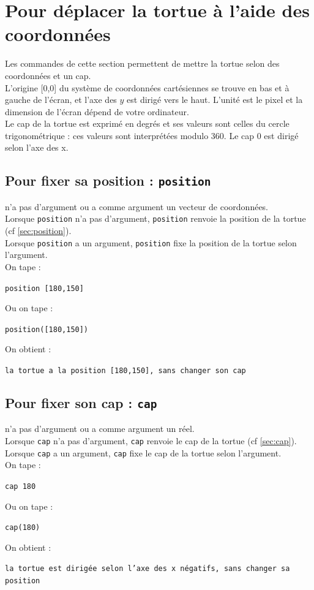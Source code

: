\documentclass[a4paper,11pt]{book}
\begin{document}
\section{Pour d\'eplacer la tortue \`a l'aide des coordonn\'ees}
Les commandes de cette section permettent de mettre la tortue selon des 
coordonn\'ees et un cap.\\
L'origine [0,0] du syst\`eme de coordonn\'ees cart\'esiennes se trouve en bas 
et \`a gauche de l'\'ecran, et l'axe des $y$ est dirig\'e vers le haut. 
L'unit\'e est le pixel et la dimension de l'\'ecran d\'epend de votre 
ordinateur.\\ 
Le cap de la tortue est exprim\'e en degr\'es et ses valeurs sont celles du 
cercle trigonom\'etrique : ces valeurs sont interpr\'et\'ees modulo 360. 
Le cap 0 est dirig\'e selon l'axe des x.

\subsection{Pour fixer sa position : {\tt position}}\label{sec:fposition}
 n'a pas d'argument ou a comme argument un vecteur de 
coordonn\'ees.\\
Lorsque {\tt position} n'a pas d'argument, {\tt position} renvoie la position
 de la tortue (cf \ref{sec:position}).\\
 Lorsque {\tt position} a un argument, {\tt position} fixe la position de la tortue selon l'argument.\\
On tape :
\begin{center}{\tt position [180,150]}\end{center}
Ou on tape :
\begin{center}{\tt position([180,150])}\end{center}
On obtient :
\begin{center}{\tt la tortue a la position [180,150], sans changer son cap}\end{center}

\subsection{Pour fixer son cap : {\tt cap}}\label{sec:fcap}
 n'a pas d'argument ou a comme argument un r\'eel.\\
 Lorsque {\tt cap} n'a pas d'argument, {\tt cap} renvoie le cap de la tortue
 (cf \ref{sec:cap}).\\
Lorsque {\tt cap} a un argument, {\tt cap} fixe le cap de la tortue selon 
l'argument.\\
On tape :
\begin{center}{\tt cap 180}\end{center}
Ou on tape :
\begin{center}{\tt cap(180)}\end{center}
On obtient :
\begin{center}{\tt la tortue est dirig\'ee selon l'axe des x n\'egatifs, sans changer sa position}\end{center}
\end{document}
